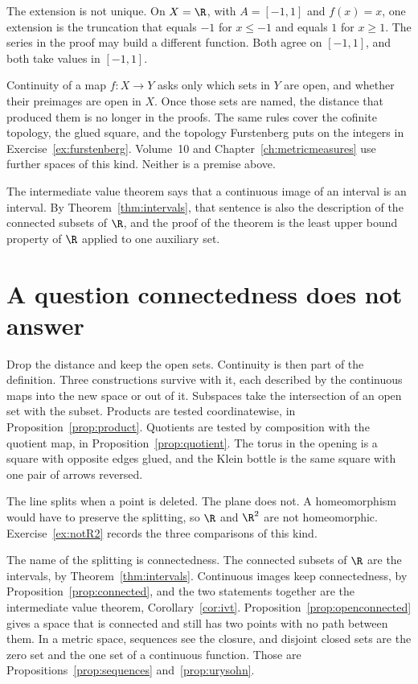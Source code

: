 The extension is not unique. On $X=\R$, with $A=[-1,1]$ and $f(x)=x$, one extension is the truncation that equals $-1$ for $x\le -1$ and equals $1$ for $x\ge 1$. The series in the proof may build a different function. Both agree on $[-1,1]$, and both take values in $[-1,1]$.

\begin{beauty}
Continuity of a map $f:X\to Y$ asks only which sets in $Y$ are open, and whether their preimages are open in $X$. Once those sets are named, the distance that produced them is no longer in the proofs. The same rules cover the cofinite topology, the glued square, and the topology Furstenberg puts on the integers in Exercise~\ref{ex:furstenberg}. Volume~10 and Chapter~\ref{ch:metricmeasures} use further spaces of this kind. Neither is a premise above.

The intermediate value theorem says that a continuous image of an interval is an interval. By Theorem~\ref{thm:intervals}, that sentence is also the description of the connected subsets of $\R$, and the proof of the theorem is the least upper bound property of $\R$ applied to one auxiliary set.
\end{beauty}

\section{A question connectedness does not answer}

Drop the distance and keep the open sets. Continuity is then part of the definition. Three constructions survive with it, each described by the continuous maps into the new space or out of it. Subspaces take the intersection of an open set with the subset. Products are tested coordinatewise, in Proposition~\ref{prop:product}. Quotients are tested by composition with the quotient map, in Proposition~\ref{prop:quotient}. The torus in the opening is a square with opposite edges glued, and the Klein bottle is the same square with one pair of arrows reversed.

The line splits when a point is deleted. The plane does not. A homeomorphism would have to preserve the splitting, so $\R$ and $\R^2$ are not homeomorphic. Exercise~\ref{ex:notR2} records the three comparisons of this kind.

The name of the splitting is connectedness. The connected subsets of $\R$ are the intervals, by Theorem~\ref{thm:intervals}. Continuous images keep connectedness, by Proposition~\ref{prop:connected}, and the two statements together are the intermediate value theorem, Corollary~\ref{cor:ivt}. Proposition~\ref{prop:openconnected} gives a space that is connected and still has two points with no path between them. In a metric space, sequences see the closure, and disjoint closed sets are the zero set and the one set of a continuous function. Those are Propositions~\ref{prop:sequences} and~\ref{prop:urysohn}.

